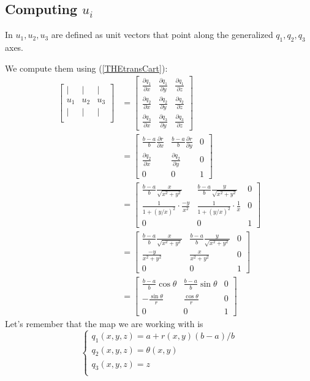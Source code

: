 \documentclass{amsart}
\begin{document}
\subsection{Computing $u_i$}

In \cite{ward96} $u_1,u_2,u_3$ are defined as unit vectors that point along the generalized $q_1,q_2,q_3$ axes.

We compute them using (\ref{THEtransCart}):
\begin{align*}
\begin{bmatrix}
  |  & |  & |\\
  u_1 & u_2 & u_3\\
  |  & |  & |\\
\end{bmatrix}
&=
\begin{bmatrix}
  \frac{\partial q_1}{\partial x} & \frac{\partial q_1}{\partial y} & \frac{\partial q_1}{\partial z}\\
  \frac{\partial q_2}{\partial x} & \frac{\partial q_2}{\partial y} & \frac{\partial q_2}{\partial z}\\
  \frac{\partial q_3}{\partial x} & \frac{\partial q_3}{\partial y} & \frac{\partial q_3}{\partial z}
\end{bmatrix}\\
&=
\begin{bmatrix}
  \frac{b-a}{b}\frac{\partial r}{\partial x} & \frac{b-a}{b}\frac{\partial r}{\partial y} & 0\\
  \frac{\partial q_2}{\partial x}& \frac{\partial q_2}{\partial y} & 0\\
  0 & 0 & 1
\end{bmatrix}\\
&=
\begin{bmatrix}
  \frac{b-a}{b}\frac{x}{\sqrt{x^2+y^2}} & \frac{b-a}{b}\frac{y}{\sqrt{x^2+y^2}} & 0\\
  \frac{1}{1+(y/x)^2}\cdot\frac{-y}{x^2}& \frac{1}{1+(y/x)^2}\cdot\frac{1}{x} & 0\\
  0 & 0 & 1
\end{bmatrix}\\
&=
\begin{bmatrix}
  \frac{b-a}{b}\frac{x}{\sqrt{x^2+y^2}} & \frac{b-a}{b}\frac{y}{\sqrt{x^2+y^2}} & 0\\
  \frac{-y}{x^2+y^2}& \frac{x}{x^2+y^2} & 0\\
  0 & 0 & 1
\end{bmatrix}\\
&=
\begin{bmatrix}
  \frac{b-a}{b}\cos\theta & \frac{b-a}{b}\sin\theta & 0\\
  -\frac{\sin\theta}{r}& \frac{\cos\theta}{r} & 0\\
  0 & 0 & 1
\end{bmatrix}
\end{align*}
Let's remember that the map we are working with is
\[\begin{cases}
  q_1(x,y,z)=a+r(x,y)(b-a)/b\\
  q_2(x,y,z)=\theta(x,y)\\
  q_3(x,y,z)=z\\
\end{cases}\]
\end{document}
